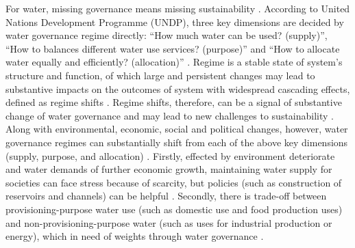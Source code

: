 \documentclass[9pt, twocolumn, twoside, lineno]{pnas-new}
\begin{document}
\label{introduction-section-2}
For water, missing governance means missing sustainability \cite{undpwatergovernancefacility2015}.
According to United Nations Development Programme (UNDP), three key dimensions are decided by water governance regime directly: ``How much water can be used? (supply)'', ``How to balances different water use services? (purpose)'' and ``How to allocate water equally and efficiently? (allocation)'' 
\cite{undpwatergovernancefacility2013,undpwatergovernancefacility2015,undpwatergovernancefacility2016}.
Regime is a stable state of system’s structure and function, of which large and persistent changes may lead to substantive impacts on the outcomes of system with widespread cascading effects, defined as regime shifts 
\cite{rocha2018,gregr2020}.
Regime shifts, therefore, can be a signal of substantive change of water governance and may lead to new challenges to sustainability 
\cite{steffen2020}.
Along with environmental, economic, social and political changes, however, water governance regimes can substantially shift from each of the above key dimensions (supply, purpose, and allocation)
\cite{undpwatergovernancefacility2013,undpwatergovernancefacility2015,undpwatergovernancefacility2016}.
Firstly, effected by environment deteriorate and water demands of further economic growth, maintaining water supply for societies can face stress because of scarcity, but policies (such as construction of reservoirs and channels) can be helpful
\cite{greveGlobalAssessmentWater2018, wada2017, qin2019}.
Secondly, there is trade-off between provisioning-purpose water use (such as domestic use and food production uses) and non-provisioning-purpose water (such as uses for industrial production or energy), which in need of weights through water governance
\cite{liu2017, florke2018}.
\end{document}
